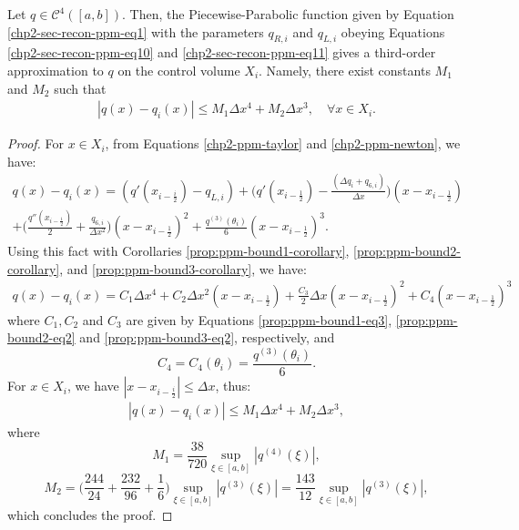 \begin{prop}
	\label{prop:ppm-bound4}
	Let $q \in \mathcal{C}^{4}([a,b])$.
	Then, the Piecewise-Parabolic function given by
	Equation \eqref{chp2-sec-recon-ppm-eq1} with 
	the parameters $q_{R,i}$ and $q_{L,i}$ obeying Equations
	\eqref{chp2-sec-recon-ppm-eq10} and \eqref{chp2-sec-recon-ppm-eq11}
	gives a third-order approximation to $q$ on the control volume $X_i$.
	Namely, there exist constants $M_1$ and $M_2$ such that
	\begin{equation*}
		\begin{split}
			|q(x)-q_i(x)| \leq  M_1 \Delta x ^4 + M_2 \Delta x ^3, \quad \forall x \in X_i.
		\end{split}
	\end{equation*}
\end{prop}
\begin{proof}
For $x \in X_i$, from Equations \eqref{chp2-ppm-taylor} and \eqref{chp2-ppm-newton}, we have:
\begin{equation*}
	\begin{split}
	q(x)-q_i(x) = (q'(x_{i-\frac{i}{2}})-q_{L,i})	
	+ \bigg(q'(x_{i-\frac{1}{2}})-  \frac{(\Delta q_i + q_{6, i})}{\Delta x}\bigg)(x-x_{i-\frac{1}{2}})
	\\+ \bigg(\frac{q''(x_{i-\frac{1}{2}})}{2} + \frac{q_{6, i}}{\Delta x^2}\bigg)(x-x_{i-\frac{1}{2}})^2
	+ \frac{q^{(3)}(\theta_i)}{6}(x-x_{i-\frac{1}{2}})^3.
	\end{split}
\end{equation*}
Using this fact with Corollaries \ref{prop:ppm-bound1-corollary}, \ref{prop:ppm-bound2-corollary},
and  \ref{prop:ppm-bound3-corollary}, we have:
\begin{equation*}
	\begin{split}
	q(x)-q_i(x) =  C_1 \Delta x ^4 + C_2 \Delta x ^2(x-x_{i-\frac{1}{2}})
	+ \frac{C_3}{2} \Delta x (x-x_{i-\frac{1}{2}})^2
	+ C_4(x-x_{i-\frac{1}{2}})^3 
	\end{split}
\end{equation*}
where $C_1, C_2$ and $C_3$ are given by Equations \eqref{prop:ppm-bound1-eq3},
\eqref{prop:ppm-bound2-eq2} and \eqref{prop:ppm-bound3-eq2}, respectively, and
\begin{equation}
	\label{prop:ppm-bound4-eq3}
	C_4 = C_4(\theta_i) = \frac{q^{(3)}(\theta_i)}{6}.
\end{equation}
For $x\in X_i$, we have $|x -x_{i-\frac{i}{2}}| \leq \Delta x$, thus:
\begin{equation*}
	\begin{split}
		|q(x)-q_i(x)| \leq  M_1 \Delta x ^4 + M_2 \Delta x ^3,
	\end{split}
\end{equation*}
where 
\begin{equation*}
M_1 = \frac{38}{720}\sup_{\xi \in [a,b]} |q^{(4)}(\xi)|, 
\end{equation*}
\begin{equation*}
M_2 = \bigg(\frac{244}{24} + \frac{232}{96} + \frac{1}{6} \bigg)
\sup_{\xi \in [a,b]} |q^{(3)}(\xi)| = \frac{143}{12} \sup_{\xi \in [a,b]} |q^{(3)}(\xi)|,
\end{equation*}
which concludes the proof.
\end{proof}

